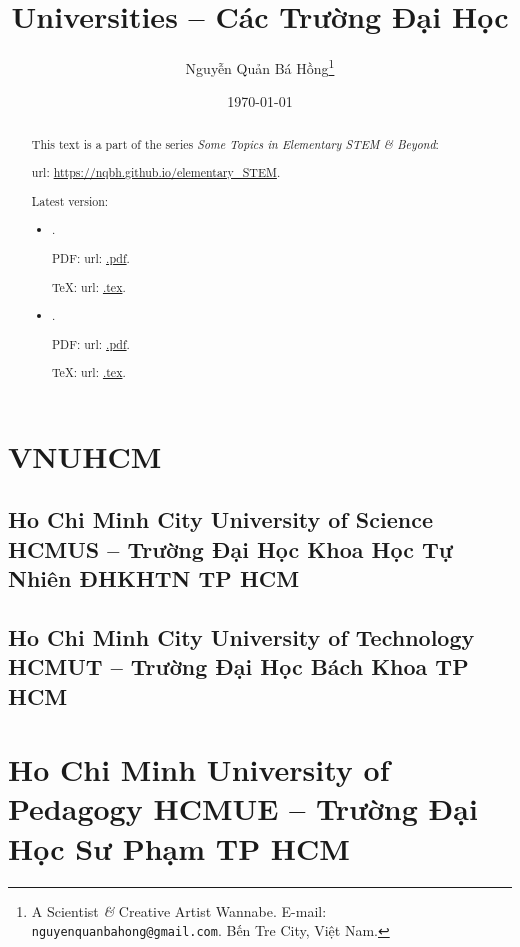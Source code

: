 \documentclass{article}
\title{Universities -- Các Trường Đại Học}
\author{Nguyễn Quản Bá Hồng\footnote{A Scientist {\it\&} Creative Artist Wannabe. E-mail: {\tt nguyenquanbahong@gmail.com}. Bến Tre City, Việt Nam.}}
\date{\today}
\begin{document}
\maketitle
\begin{abstract}
	This text is a part of the series {\it Some Topics in Elementary STEM \& Beyond}:
	
	{\sc url}: \url{https://nqbh.github.io/elementary_STEM}.
	
	Latest version:
	\begin{itemize}
		\item {\it }.
		
		PDF: {\sc url}: \url{.pdf}.
		
		\TeX: {\sc url}: \url{.tex}.
		\item {\it }.
		
		PDF: {\sc url}: \url{.pdf}.
		
		\TeX: {\sc url}: \url{.tex}.
	\end{itemize}
\end{abstract}
\tableofcontents


\section{VNUHCM}

\subsection{Ho Chi Minh City University of Science HCMUS -- Trường Đại Học Khoa Học Tự Nhiên ĐHKHTN TP HCM}


\subsection{Ho Chi Minh City University of Technology HCMUT -- Trường Đại Học Bách Khoa TP HCM}


\section{Ho Chi Minh University of Pedagogy HCMUE -- Trường Đại Học Sư Phạm TP HCM}

\end{document}
